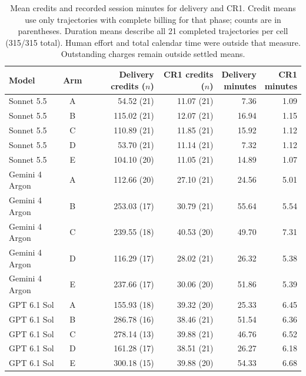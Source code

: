 \begin{table}[!htbp]
\centering\small
\setlength{\tabcolsep}{4pt}
\caption{Mean credits and recorded session minutes for delivery and CR1.
Credit means use only trajectories with complete billing for that phase;
counts are in parentheses. Duration means describe all 21 completed
trajectories per cell (315/315 total). Human effort and total calendar
time were outside that measure. Outstanding charges remain outside settled
means\@. \armlegend}\label{tab:resultscosts}

\begin{tabular*}{\textwidth}{@{\extracolsep{\fill}}lcrrrr@{}}
\toprule
Model & Arm & \shortstack{Delivery\\credits ($n$)} & \shortstack{CR1\\credits ($n$)} & \shortstack{Delivery\\minutes} & \shortstack{CR1\\minutes} \\
\midrule
Sonnet 5.5 & A & 54.52 (21) & 11.07 (21) & 7.36 & 1.09 \\
Sonnet 5.5 & B & 115.02 (21) & 12.07 (21) & 16.94 & 1.15 \\
Sonnet 5.5 & C & 110.89 (21) & 11.85 (21) & 15.92 & 1.12 \\
Sonnet 5.5 & D & 53.70 (21) & 11.14 (21) & 7.32 & 1.12 \\
Sonnet 5.5 & E & 104.10 (20) & 11.05 (21) & 14.89 & 1.07 \\
\midrule
Gemini 4 Argon & A & 112.66 (20) & 27.10 (21) & 24.56 & 5.01 \\
Gemini 4 Argon & B & 253.03 (17) & 30.79 (21) & 55.64 & 5.54 \\
Gemini 4 Argon & C & 239.55 (18) & 40.53 (20) & 49.70 & 7.31 \\
Gemini 4 Argon & D & 116.29 (17) & 28.02 (21) & 26.32 & 5.38 \\
Gemini 4 Argon & E & 237.66 (17) & 30.06 (20) & 51.86 & 5.39 \\
\midrule
GPT 6.1 Sol & A & 155.93 (18) & 39.32 (20) & 25.33 & 6.45 \\
GPT 6.1 Sol & B & 286.78 (16) & 38.46 (21) & 51.54 & 6.36 \\
GPT 6.1 Sol & C & 278.14 (13) & 39.88 (21) & 46.76 & 6.52 \\
GPT 6.1 Sol & D & 161.28 (17) & 38.51 (21) & 26.27 & 6.18 \\
GPT 6.1 Sol & E & 300.18 (15) & 39.88 (20) & 54.33 & 6.68 \\
\bottomrule
\end{tabular*}
\end{table}

